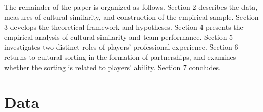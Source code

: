 \documentclass[10pt]{article}
\begin{document}



The remainder of the paper is organized as follows. Section 2 describes the data, measures of cultural similarity, and construction of the empirical sample. Section 3 develops the theoretical framework and hypotheses. Section 4 presents the empirical analysis of cultural similarity and team performance. Section 5 investigates two distinct roles of players’ professional experience. Section 6 returns to cultural sorting in the formation of partnerships, and examines whether the sorting is related to players’ ability. Section 7 concludes.
\section{Data}
\end{document}

